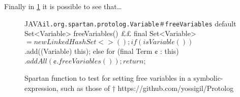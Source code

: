 Finally in \cref{figure:shock-3} it is possible to see that…

\begin{figure}[ht]
    \caption{%
      Spartan function to test for setting free variables in a symbolic-expression, such as those of \Prolog†{%
      https://github.com/yossigil/Protolog
      }
    }
\label{figure:shock-3}
\begin{Code}{JAVA}{\scriptsize\texttt{il.org.spartan.protolog.Variable＃freeVariables}}
default Set<Variable> freeVariables() {££
    final Set<Variable> $ = new LinkedHashSet<>();
    if (isVariable())
     $.add((Variable) this);
    else
      for (final Term ¢ : this)
       $.addAll(¢.freeVariables());
    return $;
  }
\end{Code}
\end{figure}
